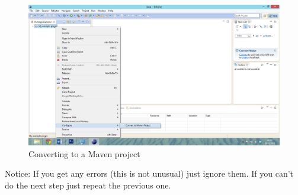 \begin{figure}
	\centering
		\includegraphics[width=\textwidth]{converttomavenproject}
	\caption{Converting to a Maven project}
	\label{fig:converttomavenproject}
\end{figure}

Notice: If you get any errors (this is not unusual) just ignore them. If you can't do the next step just repeat the previous one.



